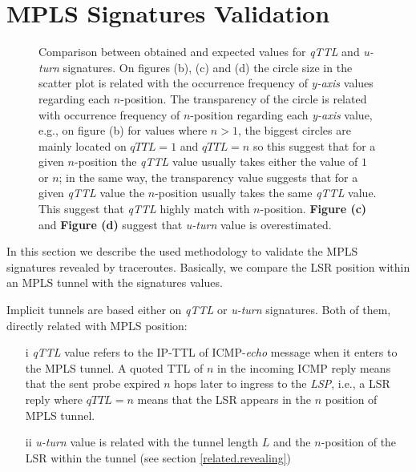 \section{MPLS Signatures Validation}\label{validation}

\begin{figure*}[!ht]
  \begin{center}
      \hfil
      \hfil
      \hfil
  \end{center}
  \caption{ Comparison between obtained and expected values for \textit{qTTL} and
  \textit{u-turn} signatures. On figures (b), (c) and (d) the circle size in the scatter plot is related with the occurrence frequency of \textit{y-axis} values regarding each $n$-position. The
  transparency of the circle is related with occurrence frequency of $n$-position  regarding each \textit{y-axis} value, e.g., on figure (b) for values where $n>1$, the biggest circles are mainly located on  $\textit{qTTL}=1$ and $\textit{qTTL}=n$ so this suggest that for a given $n$-position the \textit{qTTL} value usually takes either the value of $1$ or $n$; in the same way, the transparency value suggests that for a given \textit{qTTL} value the $n$-position usually takes the same \textit{qTTL} value. This suggest that \textit{qTTL} highly match with $n$-position.  \textbf{Figure (c)} and \textbf{Figure (d)} suggest that \textit{u-turn} value is overestimated. }
  \label{ig_signatures}
\end{figure*}

In this section we describe the used methodology to validate the MPLS signatures
revealed by traceroutes. Basically, we compare the LSR position within an MPLS tunnel with the signatures values.

Implicit tunnels are based either on \textit{qTTL} or \textit{u-turn} signatures. Both of
them, directly related with MPLS position:

\begin{itemize}
  \item[i] \textit{qTTL} value refers to the IP-TTL of ICMP-\textit{echo}
  message when it enters to the MPLS  tunnel. A quoted TTL of $n$ in
  the incoming ICMP reply means that the sent probe
  expired $n$ hops later to ingress to the \textit{LSP}, i.e., a LSR reply where $\textit{qTTL}=n$ means that the LSR appears  in the $n$ position of MPLS tunnel.
  \item[ii] \textit{u-turn} value is related with the tunnel length $L$ and the $n$-position of the LSR within the tunnel (see section \ref{related.revealing})
\end{itemize}


